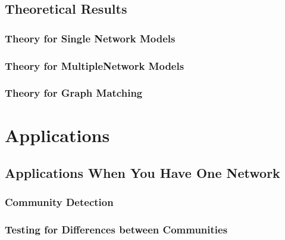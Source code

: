 \documentclass[letterpaper,10pt,english]{jupyterBook}
\begin{document}
\chapter{Theoretical Results}
\label{\detokenize{representations/ch7/ch7:theoretical-results}}\label{\detokenize{representations/ch7/ch7::doc}}

\section{Theory for Single Network Models}
\label{\detokenize{representations/ch7/theory-single-network:theory-for-single-network-models}}\label{\detokenize{representations/ch7/theory-single-network::doc}}

\section{Theory for Multiple\sphinxhyphen{}Network Models}
\label{\detokenize{representations/ch7/theory-multigraph:theory-for-multiple-network-models}}\label{\detokenize{representations/ch7/theory-multigraph::doc}}

\section{Theory for Graph Matching}
\label{\detokenize{representations/ch7/theory-matching:theory-for-graph-matching}}\label{\detokenize{representations/ch7/theory-matching::doc}}

\part{Applications}


\chapter{Applications When You Have One Network}
\label{\detokenize{applications/ch8/ch8:applications-when-you-have-one-network}}\label{\detokenize{applications/ch8/ch8::doc}}

\section{Community Detection}
\label{\detokenize{applications/ch8/community-detection:community-detection}}\label{\detokenize{applications/ch8/community-detection::doc}}

\section{Testing for Differences between Communities}
\label{\detokenize{applications/ch8/testing-differences:testing-for-differences-between-communities}}\label{\detokenize{applications/ch8/testing-differences::doc}}
\end{document}
